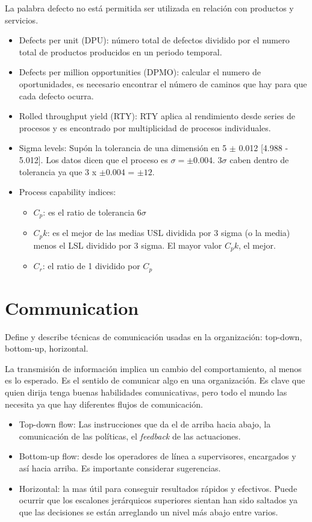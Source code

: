 \documentclass[oneside]{book}
\begin{document}
La palabra defecto no está permitida ser utilizada en relación con productos y servicios.

\begin{itemize}
	\item Defects per unit (DPU): número total de defectos dividido por el numero total de productos producidos en un periodo temporal.
	\item Defects per million opportunities (DPMO): calcular el numero de oportunidades, es necesario encontrar el número de caminos que hay para que cada defecto ocurra.
	\item Rolled throughput yield (RTY): RTY aplica al rendimiento desde series de procesos y es encontrado por multiplicidad de procesos individuales.
	\item Sigma levels: Supón la tolerancia de una dimensión en 5 $\pm$ 0.012 [4.988 - 5.012]. Los datos dicen que el proceso es $\sigma = \pm$0.004. 3$\sigma$ caben dentro de tolerancia ya que 3 x $\pm$0.004 = $\pm 12$.
	\item Process capability indices:
	\begin{itemize}
		\item $C_p$: es el ratio de tolerancia $6\sigma$ 
		\item $C_pk$: es el mejor de las medias USL dividida por 3 sigma (o la media) menos el LSL dividido por 3 sigma. El mayor valor $C_pk$, el mejor.
		\item $C_r$: el ratio de 1 dividido por $C_p$
	\end{itemize}
\end{itemize}

\section{Communication}

Define y describe técnicas de comunicación usadas en la organización: top-down, bottom-up, horizontal.

La transmisión de información implica un cambio del comportamiento, al menos es lo esperado. Es el sentido de comunicar algo en una organización. Es clave que quien dirija tenga buenas habilidades comunicativas, pero todo el mundo las necesita ya que hay diferentes flujos de comunicación.

\begin{itemize}
	\item Top-down flow: Las instrucciones que da el de arriba hacia abajo, la comunicación de las políticas, el \textit{feedback} de las actuaciones.
	\item Bottom-up flow: desde los operadores de línea a supervisores, encargados y así hacia arriba. Es importante considerar sugerencias.
	\item Horizontal: la mas útil para conseguir resultados rápidos y efectivos. Puede ocurrir que los escalones jerárquicos superiores sientan han sido saltados ya que las decisiones se están arreglando un nivel más abajo entre varios.
\end{itemize}
\end{document}
